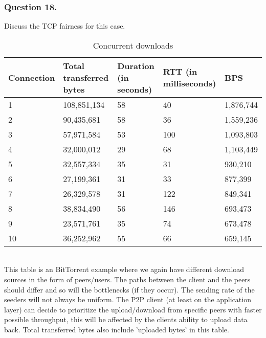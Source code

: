\documentclass{mall}
\begin{document}
\subsubsection{Question 18.}
Discuss the TCP fairness for this case.
\begin{table}[htb]
\centering
\begin{tabular}{lllll}
Connection & Total transferred bytes & Duration (in seconds) & RTT (in milliseconds) & BPS\\\hline
1&	108,851,134&	58&	40 & 1,876,744\\\hline
2&	90,435,681&	58&	36 & 1,559,236\\\hline
3&	57,971,584&	53&	100 & 1,093,803\\\hline
4&	32,000,012&	29&	68 & 1,103,449\\\hline
5&	32,557,334&	35&	31 & 930,210\\\hline
6&	27,199,361&	31&	33 & 877,399\\\hline
7&	26,329,578&	31&	122 & 849,341\\\hline
8&	38,834,490&	56&	146 & 693,473\\\hline
9&	23,571,761&	35&	74 & 673,478\\\hline
10&	36,252,962&	55&	66 & 659,145\\\hline
\end{tabular}
\caption{Concurrent downloads}
\end{table}\\
This table is an BitTorrent example where we again have different download sources in the form of peers/users. The paths between the client and the peers should differ and so will the bottlenecks (if they occur). The sending rate of the seeders will not always be uniform. The P2P client (at least on the application layer) can decide to prioritize the upload/download from specific peers with faster possible throughput, this will be affected by the clients ability to upload data back. Total transferred bytes also include 'uploaded bytes' in this table.\\
\end{document}
